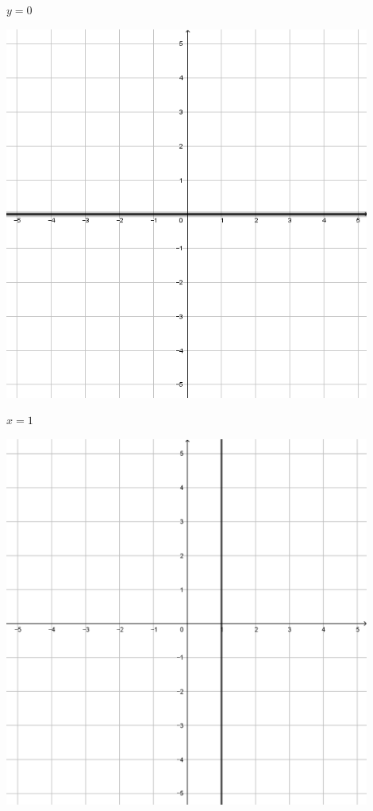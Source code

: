 \documentclass[a4paper]{oblivoir}
\begin{document}
\begin{minipage}{0.45\textwidth}\centering
\(y=0\)
\par\bigskip\includegraphics[width=0.9\textwidth]{img/1_line_31}
\end{minipage}
\begin{minipage}{0.45\textwidth}\centering
\(x=1\)
\par\bigskip\includegraphics[width=0.9\textwidth]{img/1_line_32}
\end{minipage}\bigskip\bigskip\par
\end{document}
